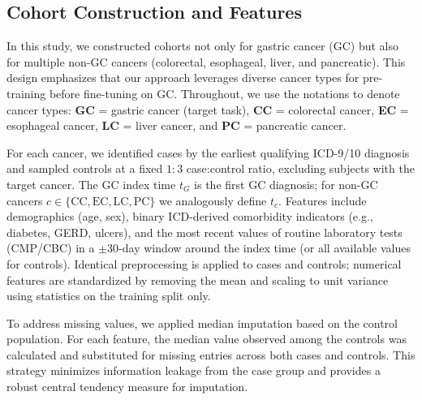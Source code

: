 \documentclass[diagnostics,article,submit,pdftex,moreauthors]{Definitions/mdpi}
\begin{document}
\subsection{Cohort Construction and Features}
In this study, we constructed cohorts not only for gastric cancer (GC) but also for multiple non-GC cancers (colorectal, esophageal, liver, and pancreatic).
This design emphasizes that our approach leverages diverse cancer types for pre-training before fine-tuning on GC.
Throughout, we use the notations to denote cancer types: \textbf{GC} = gastric cancer (target task), \textbf{CC} = colorectal cancer, \textbf{EC} = esophageal cancer, \textbf{LC} = liver cancer, and \textbf{PC} = pancreatic cancer.

For each cancer, we identified cases by the earliest qualifying ICD-9/10 diagnosis and sampled controls at a fixed $1{:}3$ case:control ratio, excluding subjects with the target cancer.
The GC index time $t_G$ is the first GC diagnosis; for non-GC cancers $c\in\{\mathrm{CC},\mathrm{EC},\mathrm{LC},\mathrm{PC}\}$ we analogously define $t_c$.
Features include demographics (age, sex), binary ICD-derived comorbidity indicators (e.g., diabetes, GERD, ulcers), and the most recent values of routine laboratory tests (CMP/CBC) in a $\pm 30$-day window around the index time (or all available values for controls).
Identical preprocessing is applied to cases and controls; numerical features are standardized by removing the mean and scaling to unit variance using statistics on the training split only.

To address missing values, we applied median imputation based on the control population. 
For each feature, the median value observed among the controls was calculated and substituted for missing entries across both cases and controls. 
This strategy minimizes information leakage from the case group and provides a robust central tendency measure for imputation.
\end{document}
